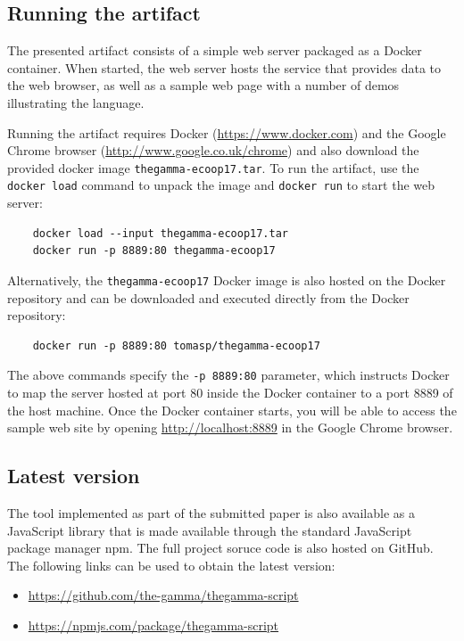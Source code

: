 \documentclass[a4paper,UKenglish]{darts}
\begin{document}
\begin{getting}

\subsection*{Running the artifact}
The presented artifact consists of a simple web server packaged as a Docker container. When 
started, the web server hosts the service that provides data to the web browser, as well as
a sample web page with a number of demos illustrating the language.

Running the artifact requires Docker (\url{https://www.docker.com}) and the Google Chrome 
browser (\url{http://www.google.co.uk/chrome}) and also download the provided
docker image \texttt{thegamma-ecoop17.tar}. To run the artifact, use the \texttt{docker load} command to 
unpack the image and \texttt{docker run} to start the web server:

\begin{verbatim}
    docker load --input thegamma-ecoop17.tar
    docker run -p 8889:80 thegamma-ecoop17
\end{verbatim}

\noindent
Alternatively, the \texttt{thegamma-ecoop17} Docker image is also hosted on the Docker repository
and can be downloaded and executed directly from the Docker repository:

\begin{verbatim}
    docker run -p 8889:80 tomasp/thegamma-ecoop17
\end{verbatim}

\noindent
The above commands specify the \texttt{-p 8889:80} parameter, which instructs Docker to map the
server hosted at port 80 inside the Docker container to a port 8889 of the host machine. Once
the Docker container starts, you will be able to access the sample web site by opening 
\url{http://localhost:8889} in the Google Chrome browser.

\subsection*{Latest version}  
The tool implemented as part of the submitted paper is also available as a JavaScript library
that is made available through the standard JavaScript package manager npm. The full
project soruce code is also hosted on GitHub. The following links can be used to obtain the latest
version:
\begin{itemize}
  \item \url{https://github.com/the-gamma/thegamma-script}
  \item \url{https://npmjs.com/package/thegamma-script}
\end{itemize}

\end{getting} 
\end{document}
